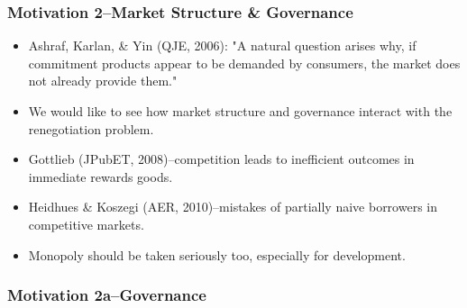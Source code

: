 \documentclass[11pt]{article}%
\begin{document}
\frametitle{Motivation 2--Market Structure \& Governance}%


\begin{itemize}
\item Ashraf, Karlan, \& Yin (QJE, 2006): "A natural question arises why, if
commitment products appear to be demanded by consumers, the market does not
already provide them."

\item We would like to see how market structure and governance interact with
the renegotiation problem.

\item Gottlieb (JPubET, 2008)--competition leads to inefficient outcomes in
immediate rewards goods.

\item Heidhues \& Koszegi (AER, 2010)--mistakes of partially naive borrowers
in competitive markets.

\item Monopoly should be taken seriously too, especially for development.
\end{itemize}

%

\frametitle{Motivation 2a--Governance}%
\end{document}
